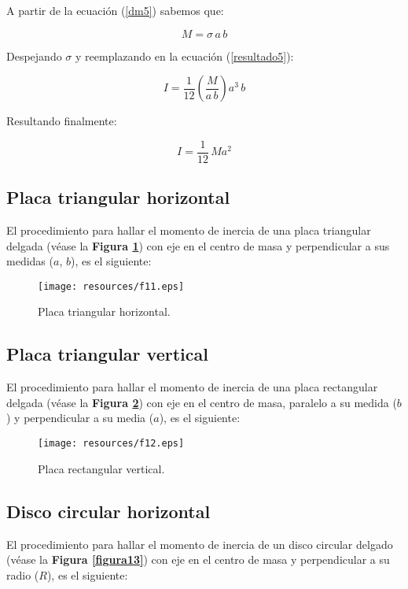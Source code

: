 \documentclass[letter,oneside,11pt]{article}
\begin{document}
A partir de la ecuación (\ref{dm5}) sabemos que:

\begin{equation*}
    M = \sigma\, a\, b
\end{equation*}

Despejando $\sigma$ y reemplazando en la ecuación (\ref{resultado5}):

\begin{equation*}
    I = \frac{1}{12} \left( \frac{M}{a\, b} \right) a^3\, b
\end{equation*}

Resultando finalmente:

\begin{equation}
    I = \frac{1}{12}\, M a^2
\end{equation}

\subsection{Placa triangular horizontal}
El procedimiento para hallar el momento de inercia de una placa triangular
delgada (véase la \textbf{Figura \ref{figura11}}) con eje en el centro de masa y
perpendicular a sus medidas ($a$, $b$), es el siguiente:

\begin{figure}
\centering
\texttt{[image: resources/f11.eps]}
\caption{Placa triangular horizontal.}
\label{figura11}
\end{figure}

\subsection{Placa triangular vertical}
El procedimiento para hallar el momento de inercia de una placa rectangular
delgada (véase la \textbf{Figura \ref{figura12}}) con eje en el centro de masa,
paralelo a su medida ($b$) y perpendicular a su media ($a$), es el siguiente:

\begin{figure}
\centering
\texttt{[image: resources/f12.eps]}
\caption{Placa rectangular vertical.}
\label{figura12}
\end{figure}

\subsection{Disco circular horizontal}
El procedimiento para hallar el momento de inercia de un disco circular
delgado (véase la \textbf{Figura \ref{figura13}}) con eje en el centro de masa y
perpendicular a su radio ($R$), es el siguiente:
\end{document}
